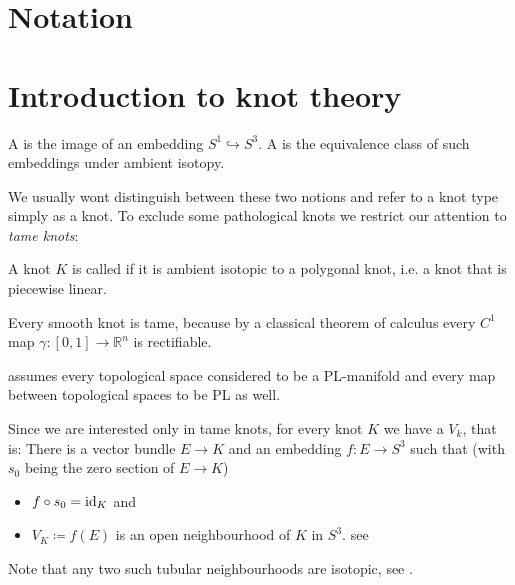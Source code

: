 
% 





\tableofcontents

\tableofcontents
\section*{Notation}

\cleardoubleoddemptypage%

\setcounter{page}{1}
\setcounter{footnote}{0}

\section{Introduction to knot theory} %
\label{sec:intro_knots}

\begin{definition}
	A  is the image of an embedding $S^1 \hookrightarrow S^3$.
	A  is the equivalence class of such embeddings under ambient isotopy.
\end{definition}

We usually wont distinguish between these two notions and refer to a knot type simply as a knot.
To exclude some pathological knots we restrict our attention to \emph{tame knots}:

\begin{definition}
	A knot $K$ is called  if it is ambient isotopic to a polygonal knot, i.e. a knot that is piecewise linear.
\end{definition}

\begin{example}
	Every smooth knot is tame, because by a classical theorem of calculus every $C^1$ map $\gamma \colon [0,1] \to \mathbb{R}^n$ is rectifiable.
\end{example}

\textcite[p.~9]{morishita} assumes every topological space considered to be a PL-manifold and every map between topological spaces to be PL as well.

Since we are interested only in tame knots, for every knot $K$ we have a  $V_k$, that is: There is a vector bundle $E \to K$ and an embedding $f \colon E \to S^3$ such that (with $s_0$ being the zero section of $E \to K$)
\begin{itemize}
	\item $f \circ s_0 = {\operatorname{id}_K}$ and
	\item $V_K \coloneqq f(E)$ is an open neighbourhood of $K$ in $S^3$. \hfill see \textcite{hirschDifferential}
\end{itemize}
Note that any two such tubular neighbourhoods are isotopic, see \textcite[Chap.~4, Thm.~5.3]{hirschDifferential}.


